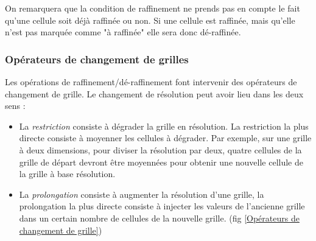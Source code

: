 
On remarquera que la condition de raffinement ne prends pas en compte le fait qu'une cellule soit déjà raffinée ou non.
Si une cellule est raffinée, mais qu'elle n'est pas marquée comme "à raffinée" elle sera donc dé-raffinée.

\subsubsection{Opérateurs de changement de grilles} 
\label{Opérateurs de changement de grilles}

Les opérations de raffinement/dé-raffinement font intervenir des opérateurs de changement de grille.
Le changement de résolution peut avoir lieu dans les deux sens :

\begin{itemize}
\item La \emph{restriction} consiste à dégrader la grille en résolution. 
La restriction la plus directe consiste à moyenner les cellules à dégrader. 
Par exemple, sur une grille à deux dimensions, pour diviser la résolution par deux, quatre cellules de la grille de départ devront être moyennées pour obtenir une nouvelle cellule de la grille à base résolution.

\item La \emph{prolongation} consiste à augmenter la résolution d'une grille, la prolongation la plus directe consiste à injecter les valeurs de l'ancienne grille dans un certain nombre de cellules de la nouvelle grille. (fig \ref{Opérateurs de changement de grille})
\end{itemize}


